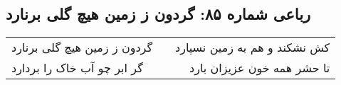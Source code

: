 \begin{center}
\section*{رباعی شماره ۸۵: گردون ز زمین هیچ گلی برنارد}
\label{sec:sh085}
\begin{longtable}{l p{0.5cm} r}
گردون ز زمین هیچ گلی برنارد
&&
کش نشکند و هم به زمین نسپارد
\\
گر ابر چو آب خاک را بردارد
&&
تا حشر همه خون عزیزان بارد
\\
\end{longtable}
\end{center}
